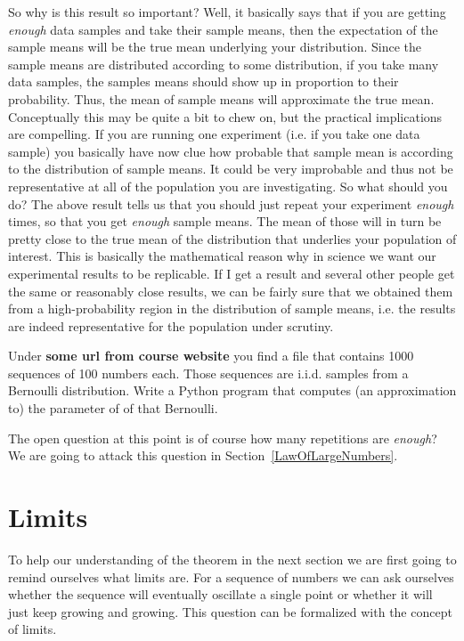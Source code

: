 So why is this result so important? Well, it basically says that if you are getting \textit{enough} data samples and take their sample means,
then the expectation of the sample means will be the true mean underlying your distribution. Since the sample means are distributed according
to some distribution, if you take many data samples, the samples means should show up in proportion to their probability. Thus, the mean
of sample means will approximate the true mean. Conceptually this may be quite a bit to chew on, but the practical implications are compelling.
If you are running one experiment (i.e. if you take one data sample) you basically have now clue how probable that sample mean is according
to the distribution of sample means. It could be very improbable and thus not be representative at all of the population you are investigating.
So what should you do? The above result tells us that you should just repeat your experiment \textit{enough} times, so that you get
\textit{enough} sample means. The mean of those will in turn be pretty close to the true mean of the distribution that underlies your population
of interest. This is basically the mathematical reason why in science we want our experimental results to be replicable. If I get a result
and several other people get the same or reasonably close results, we can be fairly sure that we obtained them from a high-probability region
in the distribution of sample means, i.e. the results are indeed representative for the population under scrutiny.

\begin{Exercise}
Under \textbf{some url from course website} you find a file that contains 1000 sequences of 100 numbers each. Those sequences are i.i.d.
samples from a Bernoulli distribution. Write a Python program that computes (an approximation to) the parameter of of that Bernoulli.
\end{Exercise}

The open question at this point is of course how many repetitions are \textit{enough}? We are going to attack this question in Section~\ref{LawOfLargeNumbers}.

\section{Limits}
To help our understanding of the theorem in the next section we are first going to remind ourselves what limits are. For a sequence of numbers
we can ask ourselves whether the sequence will eventually oscillate a single point or whether it will just keep growing and growing. This
question can be formalized with the concept of limits.

